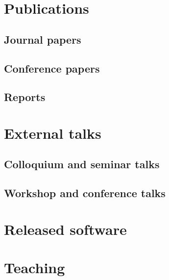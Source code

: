 \documentclass{article}
\begin{document}
\section*{Publications}

\subsection*{Journal papers}



\subsection*{Conference papers}



\subsection*{Reports}




\section*{External talks}

\subsection*{Colloquium and seminar talks}



\subsection*{Workshop and conference talks}




\section*{Released software}



\section*{Teaching}
\end{document}
